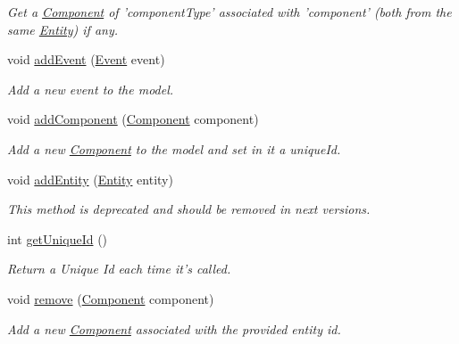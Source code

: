 \begin{DoxyCompactItemize}
\begin{DoxyCompactList}\small\item\em Get a \hyperlink{classbr_1_1unb_1_1unbomber_1_1core_1_1_component}{Component} of 'component\+Type' associated with 'component' (both from the same \hyperlink{classbr_1_1unb_1_1unbomber_1_1core_1_1_entity}{Entity}) if any. \end{DoxyCompactList}\item 
void \hyperlink{classbr_1_1unb_1_1unbomber_1_1core_1_1_entity_manager_impl_ab721a96cd45430717c39b5b3520186f9}{add\+Event} (\hyperlink{classbr_1_1unb_1_1unbomber_1_1core_1_1_event}{Event} event)
\begin{DoxyCompactList}\small\item\em Add a new event to the model. \end{DoxyCompactList}\item 
void \hyperlink{classbr_1_1unb_1_1unbomber_1_1core_1_1_entity_manager_impl_aaccc8caec7ef595b1c8569c351674b07}{add\+Component} (\hyperlink{classbr_1_1unb_1_1unbomber_1_1core_1_1_component}{Component} component)
\begin{DoxyCompactList}\small\item\em Add a new \hyperlink{classbr_1_1unb_1_1unbomber_1_1core_1_1_component}{Component} to the model and set in it a unique\+Id. \end{DoxyCompactList}\item 
void \hyperlink{classbr_1_1unb_1_1unbomber_1_1core_1_1_entity_manager_impl_aae970c329776bbd5ebef7c34ce9dc9ff}{add\+Entity} (\hyperlink{classbr_1_1unb_1_1unbomber_1_1core_1_1_entity}{Entity} entity)
\begin{DoxyCompactList}\small\item\em This method is deprecated and should be removed in next versions. \end{DoxyCompactList}\item 
int \hyperlink{classbr_1_1unb_1_1unbomber_1_1core_1_1_entity_manager_impl_a780a391574d98adbb1d2cadb3d839b15}{get\+Unique\+Id} ()
\begin{DoxyCompactList}\small\item\em Return a Unique Id each time it's called. \end{DoxyCompactList}\item 
void \hyperlink{classbr_1_1unb_1_1unbomber_1_1core_1_1_entity_manager_impl_ac0d393635f04373d73e92f7fcd2455e7}{remove} (\hyperlink{classbr_1_1unb_1_1unbomber_1_1core_1_1_component}{Component} component)
\begin{DoxyCompactList}\small\item\em Add a new \hyperlink{classbr_1_1unb_1_1unbomber_1_1core_1_1_component}{Component} associated with the provided entity id. \end{DoxyCompactList}\item 

\end{DoxyCompactItemize}
